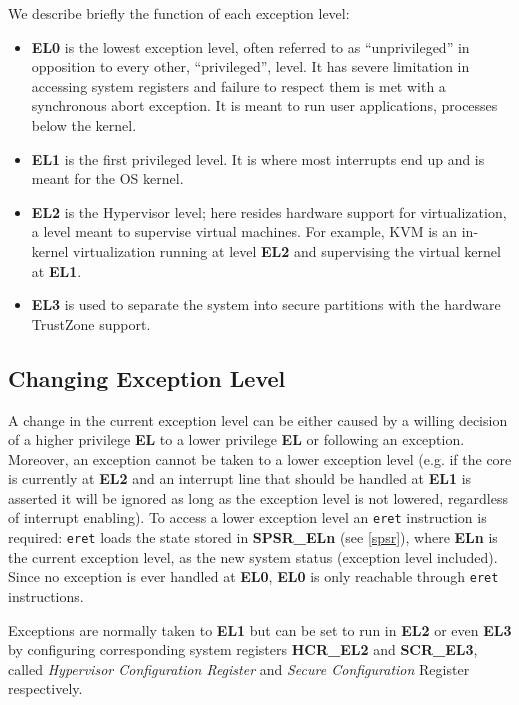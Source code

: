 \documentclass[12pt,a4paper,openright,twoside]{report}
\begin{document}
We describe briefly the function of each exception level:
\begin{itemize}
    \item \textbf{EL0} is the lowest exception level, often referred to as ``unprivileged''
        in opposition to every other, ``privileged'', level. It has severe 
        limitation in accessing system registers and failure to respect them
        is met with a synchronous abort exception. It is meant to run user applications, 
        processes below the kernel.
    \item \textbf{EL1} is the first privileged level. It is where most interrupts end
        up and is meant for the OS kernel.
    \item \textbf{EL2} is the Hypervisor level; here resides hardware support for virtualization,
        a level meant to supervise virtual machines. For example, KVM is an in-kernel
        virtualization running at level \textbf{EL2} and supervising the virtual kernel 
        at \textbf{EL1}.
    \item \textbf{EL3} is used to separate the system into secure partitions with the
        hardware TrustZone support.
\end{itemize}

\subsection{Changing Exception Level}
A change in the current exception level can be either caused by a willing decision
of a higher privilege \textbf{EL} to a lower privilege \textbf{EL} or following 
an exception. Moreover, an exception cannot be taken to a lower exception level (e.g. if the core 
is currently at \textbf{EL2} and an interrupt line that should be handled
at \textbf{EL1} is asserted it will be ignored as long as the exception
level is not lowered, regardless of interrupt enabling). 
To access a lower exception level an {\tt eret} instruction is required: {\tt eret}
loads the state stored in \textbf{SPSR\_ELn} (see \ref{spsr}), where \textbf{ELn} 
is the current exception level, as the new system status (exception level included).
Since no exception is ever handled at \textbf{EL0}, \textbf{EL0} is only reachable 
through {\tt eret} instructions.

Exceptions are normally taken to \textbf{EL1} but can be set to run in \textbf{EL2}
or even \textbf{EL3} by configuring corresponding system registers \textbf{HCR\_EL2}
and \textbf{SCR\_EL3}, called \textit{Hypervisor Configuration Register} and \textit{Secure Configuration}
Register respectively. 
\end{document}
